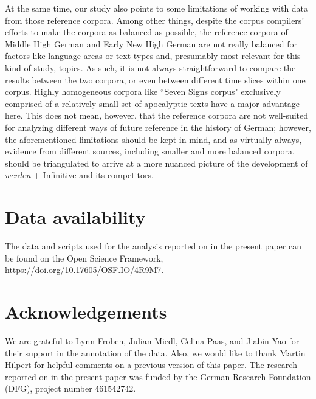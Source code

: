 \documentclass[output=paper,colorlinks,citecolor=brown]{langscibook}
\begin{document}
At the same time, our study also points to some limitations of working with data from those reference corpora. Among other things, despite the corpus compilers' efforts to make the corpora as balanced as possible, the reference corpora of Middle High German and Early New High German are not really balanced for factors like language areas or text types and, presumably most relevant for this kind of study, topics. As such, it is not always straightforward to compare the results between the two corpora, or even between different time slices within one corpus. Highly homogeneous corpora like  ``Seven Signs corpus" exclusively comprised of a relatively small set of apocalyptic texts have a major advantage here. This does not mean, however, that the reference corpora are not well-suited for analyzing different ways of future reference in the history of German; however, the aforementioned limitations should be kept in mind, and as virtually always, evidence from different sources, including smaller and more balanced corpora, should be triangulated to arrive at a more nuanced picture of the development of \textit{werden} + Infinitive and its competitors.



\section*{Data availability} \label{sec:hs:dataavailability}

The data and scripts used for the analysis reported on in the present paper can be found on the Open Science Framework, \href{https://doi.org/10.17605/OSF.IO/4R9M7}{https://doi.org/10.17605/OSF.IO/4R9M7}.


\section*{Acknowledgements}
We are grateful to Lynn Froben, Julian Miedl, Celina Paas, and Jiabin Yao for their support in the annotation of the data. Also, we would like to thank Martin Hilpert for helpful comments on a previous version of this paper. The research reported on in the present paper was funded by the German Research Foundation (DFG), project number 461542742.


\sloppy
\printbibliography[heading=subbibliography,notkeyword=this]
\end{document}
